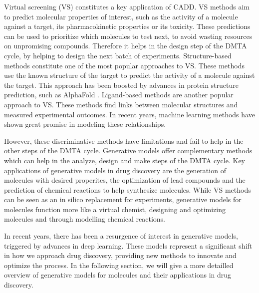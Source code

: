 Virtual screening (VS) constitutes a key application of CADD. VS methods aim to
predict molecular properties of interest, such as the activity of a molecule
against a target, its pharmacokinetic properties or its toxicity. These
predictions can be used to prioritize which molecules to test next, to avoid
wasting resources on unpromising compounds. Therefore it helps in the design
step of the DMTA cycle, by helping to design the next batch of experiments. 
Structure-based methods constitute one of the most popular approaches to VS. These methods use the known
structure of the target to predict the activity of a molecule against the target.
This approach has been boosted by advances in protein structure prediction, such
as AlphaFold \citep{todo}. Ligand-based methods are another popular approach to
VS. These methods find links between molecular structures and measured
experimental outcomes. In recent years, machine learning methods have shown
great promise in modeling these relationships. 

However, these discriminative methods have limitations and fail to help in the
other steps of the DMTA cycle. Generative models offer complementary methods
which can help in the analyze, design and make steps of the DMTA cycle. Key
applications of generative models in drug discovery are the generation of
molecules with desired properites, the optimization of lead compounds and the
prediction of chemical reactions to help synthesize molecules. While VS methods
can be seen as an in silico replacement for experiments, generative models for
molecules function more like a virtual chemist, designing and optimizing
molecules and through modelling chemical reactions.

In recent years, there has been a resurgence of interest in generative models,
triggered by advances in deep learning. These models represent a significant
shift in how we approach drug discovery, providing new methods to innovate and
optimize the process. In the following section, we will give a more detailled 
overview of generative models for molecules and their applications in drug discovery.


